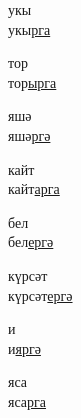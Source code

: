 \begin{multicols}{4}
\begin{enumerate}
\begin{minipage}{\linewidth}
    \item
    укы\\
    укы\underline{р}\underline{га}\\
\end{minipage}

\begin{minipage}{\linewidth}
    \item
    тор\\
    тор\underline{ыр}\underline{га}\\
\end{minipage}

\begin{minipage}{\linewidth}
    \item
    яшә\\
    яшә\underline{р}\underline{гә}\\
\end{minipage}

\begin{minipage}{\linewidth}
    \item
    кайт\\
    кайт\underline{ар}\underline{га}\\
\end{minipage}

\begin{minipage}{\linewidth}
    \item
    бел\\
    бел\underline{ер}\underline{гә}\\
\end{minipage}

\begin{minipage}{\linewidth}
    \item
    күрсәт\\
    күрсәт\underline{ер}\underline{гә}\\
\end{minipage}

\begin{minipage}{\linewidth}
    \item
    и\\
    и\underline{яр}\underline{гә}\\
\end{minipage}

\begin{minipage}{\linewidth}
    \item
    яса\\
    яса\underline{р}\underline{га}\\
\end{minipage}


\end{enumerate}
\end{multicols}
